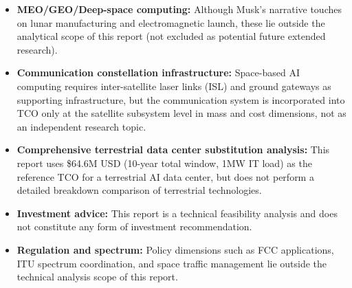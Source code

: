 \begin{itemize}[leftmargin=*]
    \item \textbf{MEO/GEO/Deep-space computing:} Although Musk's narrative touches on lunar manufacturing and electromagnetic launch, these lie outside the analytical scope of this report (not excluded as potential future extended research).
    \item \textbf{Communication constellation infrastructure:} Space-based AI computing requires inter-satellite laser links (ISL) and ground gateways as supporting infrastructure, but the communication system is incorporated into TCO only at the satellite subsystem level in mass and cost dimensions, not as an independent research topic.
    \item \textbf{Comprehensive terrestrial data center substitution analysis:} This report uses \$64.6M USD (10-year total window, 1\;MW IT load) as the reference TCO for a terrestrial AI data center, but does not perform a detailed breakdown comparison of terrestrial technologies.
    \item \textbf{Investment advice:} This report is a technical feasibility analysis and does not constitute any form of investment recommendation.
    \item \textbf{Regulation and spectrum:} Policy dimensions such as FCC applications, ITU spectrum coordination, and space traffic management lie outside the technical analysis scope of this report.
\end{itemize}

\endinput
